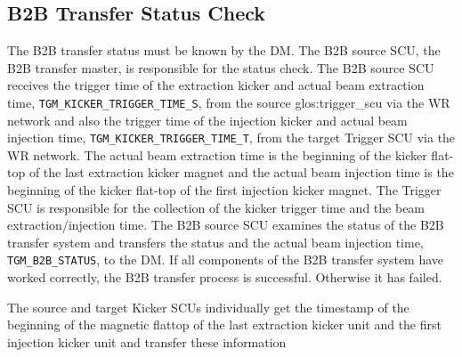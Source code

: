 %

\subsection{B2B Transfer Status Check}
The B2B transfer status must be known by the DM. The B2B source SCU, the B2B transfer master, is responsible for the status check. The B2B source SCU receives the trigger time of the extraction kicker and actual beam extraction time, \verb|TGM_KICKER_TRIGGER_TIME_S|, from the source \gls{glos:trigger_scu} via the WR network and also the trigger time of the injection kicker and actual beam injection time, \verb|TGM_KICKER_TRIGGER_TIME_T|, from the target Trigger SCU via the WR network. The actual beam extraction time is the beginning of the kicker flat-top of the last extraction kicker magnet and the actual beam injection time is the beginning of the kicker flat-top of the first injection kicker magnet. The Trigger SCU is responsible for the collection of the kicker trigger time and the beam extraction/injection time. The B2B source SCU examines the status of the B2B transfer system and transfers the status and the actual beam injection time, \verb|TGM_B2B_STATUS|, to the DM. If all components of the B2B transfer system have worked correctly, the B2B transfer process is successful. Otherwise it has failed. 

The source and target Kicker SCUs
individually get the timestamp of the beginning of the magnetic flattop of the last
extraction kicker unit and the first injection kicker unit and transfer these information
